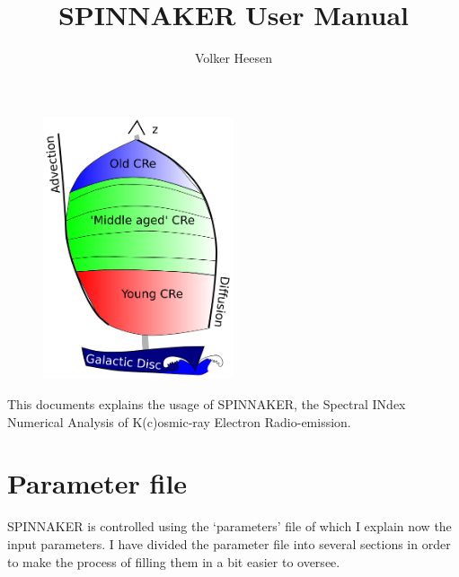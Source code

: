 \documentclass[11pt,twocolumn,a4paper]{article}
\newcommand\spix{{\small SPINNAKER}}
\begin{document}
\title{SPINNAKER User Manual}
\author{Volker Heesen}
 
\maketitle


\begin{figure}
  \centering
  \includegraphics[width=0.5\textwidth]{Spinnaker_Logo}
\end{figure}



 This documents explains the usage of \spix, the Spectral INdex Numerical Analysis of K(c)osmic-ray Electron Radio-emission.

\section{Parameter file}
{\small SPINNAKER} is controlled using the `parameters' file of which I explain now the input parameters. I have divided the parameter file into several sections in order to make the process of filling them in a bit easier to oversee.\\
\end{document}
